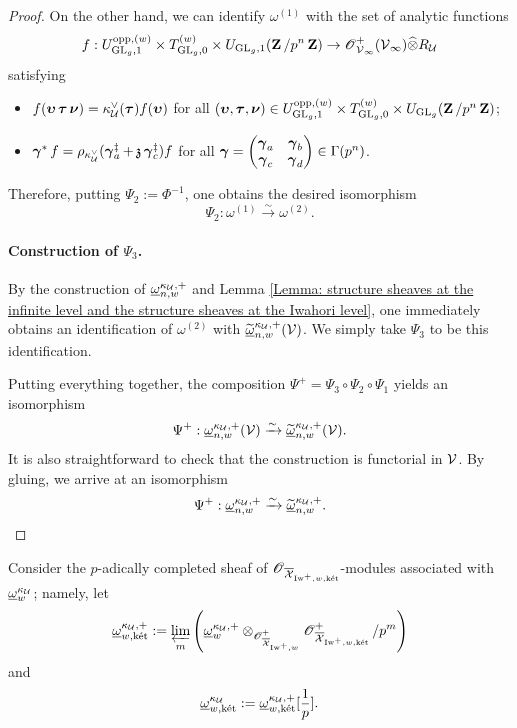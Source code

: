 \begin{proof}
On the other hand, we can identify $\omega^{(1)}$ with the set of analytic functions
$$f: U_{\GL_g, 1}^{\opp, (w)}\times T_{\GL_g, 0}^{(w)}\times U_{\GL_g,1}(\Z/p^n\Z) \rightarrow \scrO^+_{\calV_{\infty}}(\calV_{\infty})\widehat{\otimes}R_{\calU} $$
satisfying
\begin{itemize}
\item $f(\bfupsilon \bftau \bfnu) = \kappa_{\calU}^{\vee}(\bftau)f(\bfupsilon)$ for all $(\bfupsilon, \bftau, \bfnu)\in U_{\GL_g, 1}^{\opp, (w)}\times T_{\GL_g, 0}^{(w)}\times U_{\GL_g}(\Z/p^n\Z)$;
\item $\bfgamma^* f = \rho_{\kappa_{\calU}^{\vee}}(\bfgamma_a^{\ddagger}+ \frakz\bfgamma_c^{\ddagger})f$ for all $\bfgamma = \begin{pmatrix}\bfgamma_a & \bfgamma_b \\ \bfgamma_c & \bfgamma_d\end{pmatrix}\in \Gamma(p^n)$.
\end{itemize}

Therefore, putting $\Psi_2 := \Phi^{-1}$, one obtains the desired isomorphism \[
    \Psi_2: \omega^{(1)} \xrightarrow{\sim} \omega^{(2)}.
\]

\paragraph{Construction of $\Psi_3$.} By the construction of $\underline{\omega}_{n,w}^{\kappa_{\calU}, +}$ and Lemma \ref{Lemma: structure sheaves at the infinite level and the structure sheaves at the Iwahori level}, one immediately obtains an identification of $\omega^{(2)}$ with $\widetilde{\underline{\omega}}_{n,w}^{\kappa_{\calU},+}(\calV)$. We simply take $\Psi_3$ to be this identification. 

Putting everything together, the composition $\Psi^+=\Psi_3\circ\Psi_2\circ\Psi_1$ yields an isomorphism
$$\Psi^+:\underline{\omega}_{n,w}^{\kappa_{\calU},+}(\calV)\xrightarrow{\sim} \widetilde{\underline{\omega}}_{n,w}^{\kappa_{\calU},+}(\calV).$$
It is also straightforward to check that the construction is functorial in $\calV$. By gluing, we arrive at an isomorphism
$$\Psi^+:\underline{\omega}_{n,w}^{\kappa_{\calU},+}\xrightarrow{\sim} \widetilde{\underline{\omega}}_{n,w}^{\kappa_{\calU},+}.$$
\end{proof}

Consider the $p$-adically completed sheaf of $\scrO_{\overline{\calX}_{\Iw^+,w,\ket}}$-modules associated with $\underline{\omega}^{\kappa_{\calU}}_w$; namely, let
$$
\underline{\omega}^{\kappa_{\calU},+}_{w,\ket}:=\varprojlim_m\left(\underline{\omega}^{\kappa_{\calU},+}_{w}\otimes_{\scrO^+_{\overline{\calX}_{\Iw^+,w}}}\scrO^+_{\overline{\calX}_{\Iw^+,w,\ket}}/p^m\right)
$$
and
$$\underline{\omega}^{\kappa_{\calU}}_{w,\ket}:=\underline{\omega}^{\kappa_{\calU},+}_{w,\ket}[\frac{1}{p}].$$

